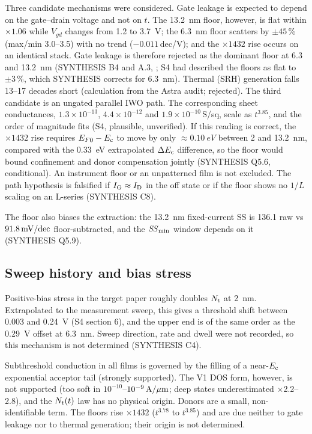 Three candidate mechanisms were considered. Gate leakage is expected to depend on the gate--drain voltage and not on $t$. The \SI{13.2}{nm} floor, however, is flat within $\times1.06$ while $V_{gd}$ changes from 1.2 to \SI{3.7}{V}; the \SI{6.3}{nm} floor scatters by $\pm45$\,\% (max/min 3.0--3.5) with no trend ($-0.011$\,dec/V); and the $\times1432$ rise occurs on an identical stack. Gate leakage is therefore rejected as the dominant floor at 6.3 and \SI{13.2}{nm} (SYNTHESIS B4 and A.3, \evDATA; S4 had described the floors as flat to $\pm3$\,\%, which SYNTHESIS corrects for \SI{6.3}{nm}). Thermal (SRH) generation falls 13--17 decades short (calculation from the Astra audit; rejected). The third candidate is an ungated parallel IWO path. The corresponding sheet conductances, $1.3\times10^{-13}$, $4.4\times10^{-12}$ and $1.9\times10^{-10}$\,S/sq, scale as $t^{3.85}$, and the order of magnitude fits (S4, plausible, unverified). If this reading is correct, the $\times1432$ rise requires $E_{F0} - E_{\mathrm{c}}$ to move by only $\approx\SI{0.10}{eV}$ between 2 and \SI{13.2}{nm}, compared with the \SI{0.33}{eV} extrapolated $\Delta E_{\mathrm{c}}$ difference, so the floor would bound confinement and donor compensation jointly (SYNTHESIS Q5.6, conditional). An instrument floor or an unpatterned film is not excluded. The path hypothesis is falsified if $I_{\mathrm{G}} \approx I_{\mathrm{D}}$ in the off state or if the floor shows no $1/L$ scaling on an L-series (SYNTHESIS C8).

The floor also biases the extraction: the \SI{13.2}{nm} fixed-current SS is 136.1 raw vs $91.8\,\mathrm{mV/dec}$ floor-subtracted, and the $\mathit{SS}_{\min}$ window depends on it (SYNTHESIS Q5.9).

\subsection{Sweep history and bias stress}
Positive-bias stress in the target paper roughly doubles $N_{\mathrm{t}}$ at \SI{2}{nm}. Extrapolated to the measurement sweep, this gives a threshold shift between 0.003 and \SI{0.24}{V} (S4 section 6), and the upper end is of the same order as the \SI{0.29}{V} offset at \SI{6.3}{nm}. Sweep direction, rate and dwell were not recorded, so this mechanism is not determined (SYNTHESIS C4).

\begin{keyresult}[title={Traps, donors and floors: verdict}]
Subthreshold conduction in all films is governed by the filling of a near-$E_{\mathrm{c}}$ exponential acceptor tail (strongly supported). The V1 DOS form, however, is not supported (too soft in $10^{-10}$--$10^{-9}\,\mathrm{A}/\mu\mathrm{m}$; deep states underestimated $\times$2.2--2.8), and the $N_{\mathrm{t}}(t)$ law has no physical origin. Donors are a small, non-identifiable term. The floors rise $\times1432$ ($t^{3.78}$ to $t^{3.85}$) and are due neither to gate leakage nor to thermal generation; their origin is not determined.
\end{keyresult}

